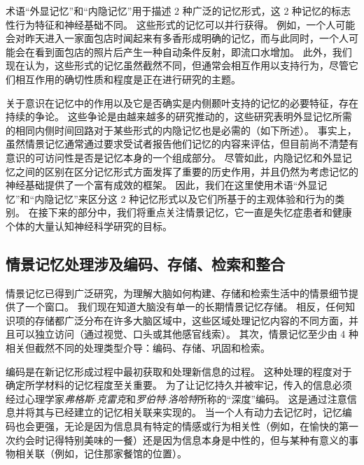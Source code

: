 术语“外显记忆”和“内隐记忆”用于描述 2 种广泛的记忆形式，这 2 种记忆的标志性行为特征和神经基础不同。
这些形式的记忆可以并行获得。
例如，一个人可能会对昨天进入一家面包店时闻起来有多香形成明确的记忆，而与此同时，一个人可能会在看到面包店的照片后产生一种自动条件反射，即流口水增加。
此外，我们现在认为，这些形式的记忆虽然截然不同，但通常会相互作用以支持行为，尽管它们相互作用的确切性质和程度是正在进行研究的主题。


关于意识在记忆中的作用以及它是否确实是内侧颞叶支持的记忆的必要特征，存在持续的争论。
这些争论是由越来越多的研究推动的，这些研究表明外显记忆所需的相同内侧时间回路对于某些形式的内隐记忆也是必需的（如下所述）。
事实上，虽然情景记忆通常通过要求受试者报告他们记忆的内容来评估，但目前尚不清楚有意识的可访问性是否是记忆本身的一个组成部分。
尽管如此，内隐记忆和外显记忆之间的区别在区分记忆形式方面发挥了重要的历史作用，并且仍然为考虑记忆的神经基础提供了一个富有成效的框架。
因此，我们在这里使用术语“外显记忆”和“内隐记忆”来区分这 2 种记忆形式以及它们所基于的主观体验和行为的类别。
在接下来的部分中，我们将重点关注情景记忆，它一直是失忆症患者和健康个体的大量认知神经科学研究的目标。


\subsection{情景记忆处理涉及编码、存储、检索和整合}

情景记忆已得到广泛研究，为理解大脑如何构建、存储和检索生活中的情景细节提供了一个窗口。
我们现在知道大脑没有单一的长期情景记忆存储。
相反，任何知识项的存储都广泛分布在许多大脑区域中，这些区域处理记忆内容的不同方面，并且可以独立访问（通过视觉、口头或其他感官线索）。
其次，情景记忆至少由 4 种相关但截然不同的处理类型介导：编码、存储、巩固和检索。


编码是在新记忆形成过程中最初获取和处理新信息的过程。
这种处理的程度对于确定所学材料的记忆程度至关重要。
为了让记忆持久并被牢记，传入的信息必须经过心理学家\textit{弗格斯$\cdot$克雷克}和\textit{罗伯特$\cdot$洛哈特}所称的“深度”编码。
这是通过注意信息并将其与已经建立的记忆相关联来实现的。
当一个人有动力去记忆时，记忆编码也会更强，无论是因为信息具有特定的情感或行为相关性（例如，在愉快的第一次约会时记得特别美味的一餐）还是因为信息本身是中性的，但与某种有意义的事物相关联（例如，记住那家餐馆的位置）。


